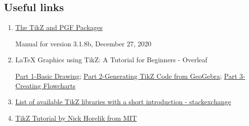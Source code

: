 
\subsection{Useful links}

\begin{enumerate}

    \item \href{https://mirror.foobar.to/CTAN/graphics/pgf/base/doc/pgfmanual.pdf}{The TikZ and PGF Packages}
    
        Manual for version 3.1.8b, December 27, 2020
    \item LaTeX Graphics using TikZ: A Tutorial for Beginners - Overleaf
    
    \href{https://www.overleaf.com/learn/latex/LaTeX_Graphics_using_TikZ:_A_Tutorial_for_Beginners_(Part_1)%E2%80%94Basic_Drawing}{Part 1-Basic Drawing}; 
    \href{https://www.overleaf.com/learn/latex/LaTeX_Graphics_using_TikZ:_A_Tutorial_for_Beginners_(Part_2)%E2%80%94Generating_TikZ_Code_from_GeoGebra}{Part 2-Generating TikZ Code from GeoGebra}; 
    \href{https://www.overleaf.com/learn/latex/LaTeX_Graphics_using_TikZ:_A_Tutorial_for_Beginners_(Part_3)%E2%80%94Creating_Flowcharts}{Part 3-Creating Flowcharts}
    
    \item \href{https://tex.stackexchange.com/questions/42611/list-of-available-tikz-libraries-with-a-short-introduction}{List of available TikZ libraries with a short introduction - stackexchange}
    
    \item \href{https://web.mit.edu/custer/Desktop/custer/MacData/afs/sipb/project/latex/tutorial_latex_tikz.pdf}{TikZ Tutorial by Nick Horelik from MIT}
    
\end{enumerate}